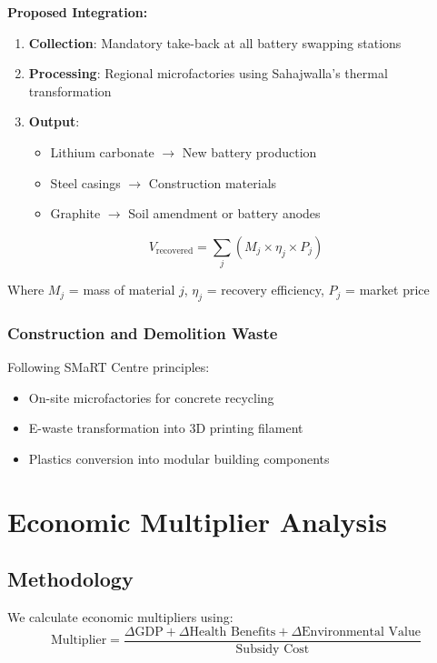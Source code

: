 \documentclass[12pt,a4paper]{article}
\begin{document}
\textbf{Proposed Integration:}
\begin{enumerate}
    \item \textbf{Collection}: Mandatory take-back at all battery swapping stations
    \item \textbf{Processing}: Regional microfactories using Sahajwalla's thermal transformation
    \item \textbf{Output}: 
    \begin{itemize}
        \item Lithium carbonate $\rightarrow$ New battery production
        \item Steel casings $\rightarrow$ Construction materials
        \item Graphite $\rightarrow$ Soil amendment or battery anodes
    \end{itemize}
\end{enumerate}

\begin{equation}
    V_{\text{recovered}} = \sum_{j} (M_j \times \eta_j \times P_j)
\end{equation}

Where $M_j$ = mass of material $j$, $\eta_j$ = recovery efficiency, $P_j$ = market price

\subsubsection{Construction and Demolition Waste}

Following SMaRT Centre principles:
\begin{itemize}
    \item On-site microfactories for concrete recycling
    \item E-waste transformation into 3D printing filament
    \item Plastics conversion into modular building components
\end{itemize}

\section{Economic Multiplier Analysis}

\subsection{Methodology}

We calculate economic multipliers using:
\begin{equation}
    \text{Multiplier} = \frac{\Delta \text{GDP} + \Delta \text{Health Benefits} + \Delta \text{Environmental Value}}{\text{Subsidy Cost}}
\end{equation}
\end{document}
